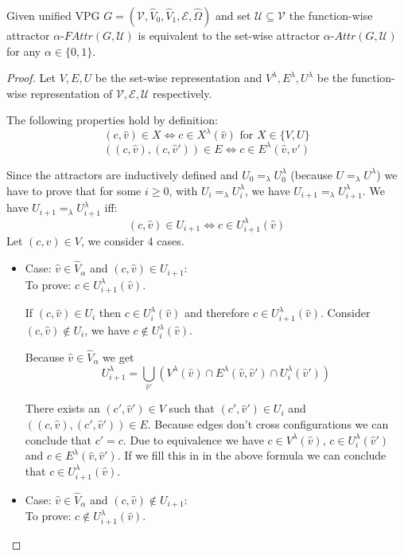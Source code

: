 \begin{lemma}
	\label{lem_attr_equal}
	Given unified VPG $G = (\mathcal{V},\hat{V}_0,\hat{V}_1, \mathcal{E}, \hat{\Omega})$ and set $\mathcal{U} \subseteq \mathcal{V}$ the function-wise attractor $\alpha\textit{-FAttr}(G,\mathcal{U})$ is equivalent to the set-wise attractor $\alpha\textit{-Attr}(G,\mathcal{U})$ for any $\alpha \in \{0,1\}$.
	\begin{proof}
		Let $V,E,U$ be the set-wise representation and $V^\lambda,E^\lambda,U^\lambda$ be the function-wise representation of $\mathcal{V},\mathcal{E},\mathcal{U}$ respectively.
		
		The following properties hold by definition:
		\[ (c,\hat{v}) \in X \iff c \in X^\lambda(\hat{v})\text{ for } X\in \{V,U\}\]
		\[ ((c,\hat{v}),(c,\hat{v}')) \in E \iff c \in E^\lambda(\hat{v},\hat{v}') \]
		
		Since the attractors are inductively defined and $U_0 =_\lambda U^\lambda_0$ (because $U =_\lambda U^\lambda$) we have to prove that for some $i \geq 0$, with $U_i =_\lambda U^\lambda_i$,  we have $U_{i+1} =_\lambda U^\lambda_{i+1}$. We have $U_{i+1} =_\lambda U^\lambda_{i+1}$ iff:
		\[ (c,\hat{v}) \in U_{i+1} \iff c \in U^\lambda_{i+1}(\hat{v}) \]
		Let $(c,\hat{v}) \in V$, we consider 4 cases.
		\begin{itemize}
			\item Case: $\hat{v} \in \hat{V}_{\alpha}$ and $(c,\hat{v}) \in U_{i+1}$:\\
			To prove: $c \in U^\lambda_{i+1}(\hat{v})$.
			
			If $(c,\hat{v}) \in U_i$ then $c \in U^\lambda_i(\hat{v})$ and therefore $c \in U^\lambda_{i+1}(\hat{v})$. Consider $(c,\hat{v}) \notin U_i$, we have $c \notin U^\lambda_i(\hat{v})$.
			
			
			Because $\hat{v} \in \hat{V}_{\alpha}$ we get
			\[ U^\lambda_{i+1} =\bigcup_{\hat{v}'} (V^\lambda(\hat{v}) \cap E^\lambda(\hat{v},\hat{v}') \cap U^\lambda_i(\hat{v}')) \]
			
			There exists an $(c',\hat{v}') \in V$ such that $(c',\hat{v}') \in U_i$ and $((c,\hat{v}),(c',\hat{v}')) \in E$. Because edges don't cross configurations we can conclude that $c' = c$. Due to equivalence we have $c \in V^\lambda(\hat{v})$, $c \in U^\lambda_i(\hat{v}')$ and $c \in E^\lambda(\hat{v},\hat{v}')$. If we fill this in in the above formula we can conclude that $c \in U^\lambda_{i+1}(\hat{v})$.
			\item Case: $\hat{v} \in \hat{V}_{\alpha}$ and $(c,\hat{v}) \notin U_{i+1}$:\\
			To prove: $c \notin U^\lambda_{i+1}(\hat{v})$.
			

\end{itemize}
\end{proof}
\end{lemma}
